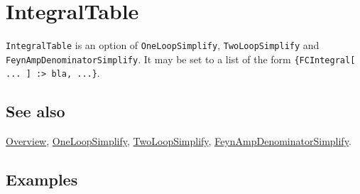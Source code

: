 \documentclass[../FeynCalcManual.tex]{subfiles}
\begin{document}
\hypertarget{integraltable}{%
\section{IntegralTable}\label{integraltable}}

\texttt{IntegralTable} is an option of \texttt{OneLoopSimplify},
\texttt{TwoLoopSimplify} and \texttt{FeynAmpDenominatorSimplify}. It may
be set to a list of the form
\texttt{\{\allowbreak{}FCIntegral[\allowbreak{} ... ] :> bla,\ \allowbreak{}...\}}.

\subsection{See also}

\hyperlink{toc}{Overview}, \hyperlink{oneloopsimplify}{OneLoopSimplify},
\hyperlink{twoloopsimplify}{TwoLoopSimplify},
\hyperlink{feynampdenominatorsimplify}{FeynAmpDenominatorSimplify}.

\subsection{Examples}
\end{document}
